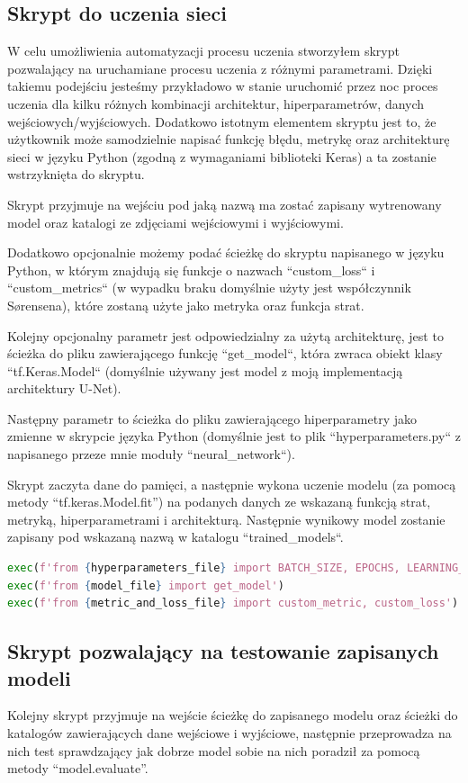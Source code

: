 \documentclass{article}
\begin{document}
\subsection{Skrypt do uczenia sieci}
W celu umożliwienia automatyzacji procesu uczenia stworzyłem skrypt pozwalający na uruchamiane procesu uczenia z różnymi parametrami.
Dzięki takiemu podejściu jesteśmy przykładowo w stanie uruchomić przez noc proces uczenia dla kilku różnych kombinacji architektur, hiperparametrów, danych wejściowych/wyjściowych. Dodatkowo istotnym elementem skryptu jest to, że użytkownik może samodzielnie napisać  funkcję błędu, metrykę oraz architekturę sieci w języku Python (zgodną z wymaganiami biblioteki Keras) a ta zostanie wstrzyknięta do skryptu.

Skrypt przyjmuje na wejściu pod jaką nazwą ma zostać zapisany wytrenowany model oraz katalogi ze zdjęciami wejściowymi i wyjściowymi.

Dodatkowo opcjonalnie możemy podać ścieżkę do skryptu napisanego w języku Python, w którym znajdują się funkcje o nazwach ``custom\_loss`` i ``custom\_metrics`` (w wypadku braku domyślnie użyty jest współczynnik Sørensena), które zostaną użyte jako metryka oraz funkcja strat.

Kolejny opcjonalny parametr jest odpowiedzialny za użytą architekturę, jest to ścieżka do pliku zawierającego funkcję ``get\_model``, która zwraca obiekt klasy ``tf.Keras.Model`` (domyślnie używany jest model z moją implementacją architektury U-Net).

Następny parametr to ścieżka do pliku zawierającego hiperparametry jako zmienne w skrypcie języka Python (domyślnie jest to plik ``hyperparameters.py`` z napisanego przeze mnie moduły ``neural\_network``).

Skrypt zaczyta dane do pamięci, a następnie wykona uczenie modelu (za pomocą metody ``tf.keras.Model.fit'') na podanych danych ze wskazaną funkcją strat, metryką, hiperparametrami i architekturą.
Następnie wynikowy model zostanie zapisany pod wskazaną nazwą w katalogu ``trained\_models``.
\begin{lstlisting}[caption={Dynamiczne wstrzykiwanie funkcji oraz stałych z innych skryptów},language=Python]
exec(f'from {hyperparameters_file} import BATCH_SIZE, EPOCHS, LEARNING_RATE, VALIDATION_SPLIT')
exec(f'from {model_file} import get_model')
exec(f'from {metric_and_loss_file} import custom_metric, custom_loss')
\end{lstlisting}
\subsection{Skrypt pozwalający na testowanie zapisanych modeli}
Kolejny skrypt przyjmuje na wejście ścieżkę do zapisanego modelu oraz ścieżki do katalogów zawierających dane wejściowe i wyjściowe, następnie przeprowadza na nich test sprawdzający jak dobrze model sobie na nich poradził za pomocą metody ``model.evaluate''.
\end{document}
